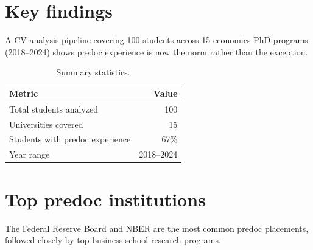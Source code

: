 \documentclass[11pt]{article}
\begin{document}

\section{Key findings}

A CV-analysis pipeline covering 100 students across 15 economics PhD programs (2018--2024) shows predoc experience is now the norm rather than the exception.

\begin{table}[ht]
\centering
\begin{tabular}{@{}lr@{}}
\toprule
Metric & Value \\
\midrule
Total students analyzed & 100 \\
Universities covered & 15 \\
Students with predoc experience & 67\% \\
Year range & 2018--2024 \\
\bottomrule
\end{tabular}
\caption{Summary statistics.}
\end{table}

\section{Top predoc institutions}

The Federal Reserve Board and NBER are the most common predoc placements, followed closely by top business-school research programs.
\end{document}
